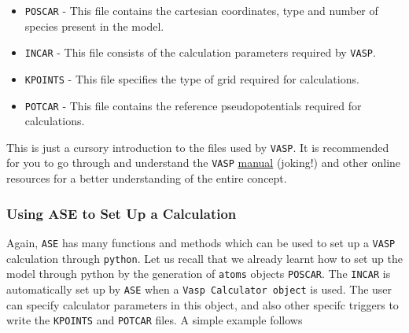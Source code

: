 \documentclass[11pt]{article}
\providecommand{\tightlist}{%
      \setlength{\itemsep}{0pt}\setlength{\parskip}{0pt}}
\begin{document}
\begin{itemize}
\tightlist
\item
  \texttt{POSCAR} - This file contains the cartesian coordinates, type
  and number of species present in the model.
\item
  \texttt{INCAR} - This file consists of the calculation parameters
  required by \texttt{VASP}.
\item
  \texttt{KPOINTS} - This file specifies the type of grid required for
  calculations.
\item
  \texttt{POTCAR} - This file contains the reference pseudopotentials
  required for calculations.
\end{itemize}

This is just a cursory introduction to the files used by \texttt{VASP}.
It is recommended for you to go through and understand the \texttt{VASP}
\href{https://www.vasp.at/index.php/documentation}{manual} (joking!) and
other online resources for a better understanding of the entire concept.

    \subsubsection{Using ASE to Set Up a
Calculation}\label{using-ase-to-set-up-a-calculation}

Again, \texttt{ASE} has many functions and methods which can be used to
set up a \texttt{VASP} calculation through \texttt{python}. Let us
recall that we already learnt how to set up the model through python by
the generation of \texttt{atoms} objects \texttt{POSCAR}. The
\texttt{INCAR} is automatically set up by \texttt{ASE} when a
\texttt{Vasp\ Calculator\ object} is used. The user can specify
calculator parameters in this object, and also other specifc triggers to
write the \texttt{KPOINTS} and \texttt{POTCAR} files. A simple example
follows
\end{document}
